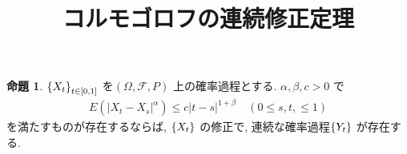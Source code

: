 \documentclass[10pt, fleqn, label-section=none]{bxjsarticle}
\title{コルモゴロフの連続修正定理}
\date{}
\author{}
\theoremstyle{definition}
\newtheorem{prop}[dfn]{命題}
\newcommand{\cbra}[1]{\mleft\{#1\mright\}}
\newcommand{\abs}[1]{\left|#1\right|}
\renewcommand{\;}{\, ; \,}
\begin{document}
\maketitle

\section{}


\begin{prop}
$\cbra{X_t}_{t \in [0,1]}$ を$(\Omega, \mathcal F, P)$ 上の確率過程とする. $\alpha, \beta, c > 0$ で
\begin{align*} E(\abs{X_t - X_s}^\alpha) \leq c \abs{t -s} ^{1 + \beta} \quad (0 \leq s,t, \leq 1) \end{align*}
を満たすものが存在するならば, $\cbra{X_t}$ の修正で, 連続な確率過程$\cbra{Y_t}$ が存在する. 
\end{prop}
\end{document}
